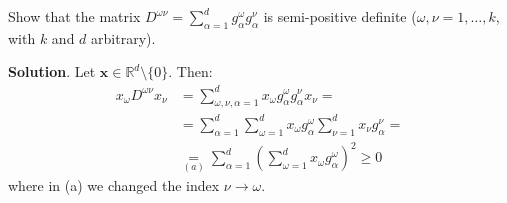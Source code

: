 \documentclass[../template.tex]{subfiles}
\begin{document}
\begin{exo}
    Show that the matrix $D^{\omega \nu} = \sum_{\alpha =1}^d g_\alpha^\omega g^\nu_\alpha$ is semi-positive definite ($\omega, \nu = 1, \dots, k$, with $k$ and $d$ arbitrary).
    
    \medskip

    \textbf{Solution}. Let $\bm{x} \in \mathbb{R}^d \setminus \{0\}$. Then:
    \begin{align*}
        x_\omega D^{\omega \nu} x_\nu &= \sum_{\omega, \nu, \alpha = 1}^d x_{\omega} g_\alpha^\omega g_\alpha^\nu  x_\nu =\\
        &= \sum_{\alpha=1}^d \sum_{\omega = 1}^d x_\omega g_\alpha^\omega \sum_{\nu =1}^d x_\nu g^\nu_{\alpha} =\\
        &\underset{(a)}{=}  \sum_{\alpha = 1}^d \left(\sum_{\omega= 1}^d x_{\omega} g_\alpha^\omega\right)^2 \geq 0 
    \end{align*} 
    where in (a) we changed the index $\nu \to \omega$. 
\end{exo}
\end{document}

